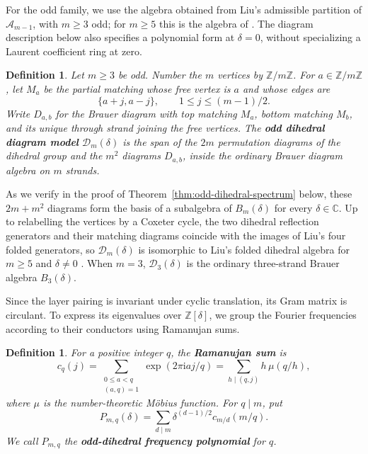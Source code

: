 \documentclass[11pt,a4paper]{amsart}
\theoremstyle{uprightdefinition}
\newtheorem{definition}[theorem]{Definition}
\theoremstyle{remark}\newtheorem{remark}[theorem]{Remark}
\begin{document}
\label{subsec:odd-dihedral-spectrum}

For the odd family, we use the algebra obtained from Liu's admissible
partition of $\mathscr{A}_{m-1}$, with $m\geq3$ odd; for $m\geq5$ this is the algebra
of \cite[Definition~1.2 and Theorem~1.6]{LiuI22014}.
The diagram description below also specifies a polynomial form at
$\delta=0$, without specializing a Laurent coefficient ring at zero.

\begin{definition}\label{def:odd-dihedral}
Let $m\ge3$ be odd. Number the $m$ vertices by $\mathbb Z/m\mathbb Z$.
For $a\in\mathbb Z/m\mathbb Z$,
let $M_a$ be the partial matching whose free vertex is $a$ and whose edges are
\[
 \{a+j,a-j\},\qquad 1\leq j\leq(m-1)/2.
\]
Write $D_{a,b}$ for the Brauer diagram with top matching $M_a$, bottom
matching $M_b$, and its unique through strand joining the free vertices.
The \textbf{odd dihedral diagram model} $\mathcal D_m(\delta)$
is the span of the $2m$ permutation diagrams of
the dihedral group and the $m^2$ diagrams $D_{a,b}$, inside the ordinary
Brauer diagram algebra on $m$ strands.
\end{definition}

As we verify in the proof of Theorem~\ref{thm:odd-dihedral-spectrum} below, these $2m+m^2$ diagrams form the basis
of a subalgebra of $B_m(\delta)$ for every $\delta\in\mathbb C$.
Up to relabelling the vertices by a Coxeter cycle, the two dihedral reflection
generators and their matching diagrams coincide with the images of Liu's
four folded generators, so $\mathcal D_m(\delta)$ is isomorphic to Liu's folded dihedral algebra
for $m\ge5$ and $\delta\ne0$ \cite[Theorem~1.6]{LiuI22014}.
When $m=3$, $\mathcal D_3(\delta)$ is the ordinary
three-strand Brauer algebra $B_3(\delta)$.

Since the layer pairing is invariant under cyclic translation, its Gram matrix is circulant. To express its
eigenvalues over $\mathbb Z[\delta]$, we group the Fourier
frequencies according to their conductors using Ramanujan sums.

\begin{definition}\label{def:ramanujan}
For a positive integer $q$, the \textbf{Ramanujan sum}
\cite[Sections~1--2, equations~(2.5)--(2.7)]{Ramanujan1918} is
\[
 c_q(j)=\sum_{\substack{0\leq a<q\\(a,q)=1}}
             \exp(2\pi\mathrm i aj/q)
       =\sum_{h\mid(q,j)}h\,\mu(q/h),
\]
where $\mu$ is the number-theoretic M\"obius function. For $q\mid m$, put
\begin{equation}\label{eq:dihedral-ramanujan}
 P_{m,q}(\delta)=\sum_{d\mid m}
       \delta^{(d-1)/2}c_{m/d}(m/q).
\end{equation}
We call $P_{m,q}$ the \textbf{odd-dihedral frequency polynomial}
for $q$.
\end{definition}
\end{document}
